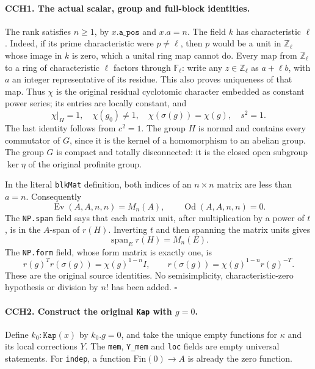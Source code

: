 \paragraph{CCH1. The actual scalar, group and full-block identities.}
\label{claim:CCH1}
The rank satisfies $n\ge1$, by $x.\texttt{a\_pos}$ and $x.a=n$.
The field $k$ has characteristic $\ell$.  Indeed, if its prime
characteristic were $p\ne\ell$, then $p$ would be a unit in
$\mathbb Z_\ell$ whose image in $k$ is zero, which a unital ring
map cannot do.  Every map from $\mathbb Z_\ell$ to a ring of
characteristic $\ell$ factors through $\mathbb F_\ell$: write any
$z\in\mathbb Z_\ell$ as $a+\ell b$, with $a$ an integer representative
of its residue.  This also proves uniqueness of that map.  Thus
$\chi$ is the original residual cyclotomic character embedded as
constant power series; its entries are locally constant, and
\[
 \chi|_H=1,\quad \chi(g_0)\ne1,\quad
 \chi(\sigma(g))=\chi(g),\quad s^2=1.
 \tag{CCH.3}
\]
The last identity follows from $c^2=1$.  The group $H$ is normal
and contains every commutator of $G$, since it is the kernel of a
homomorphism to an abelian group.  The group $G$ is compact and
totally disconnected: it is the closed open subgroup $\ker\eta$
of the original profinite group.

In the literal \texttt{blkMat} definition, both indices of an
$n\times n$ matrix are less than $a=n$.  Consequently
\[
 \operatorname{Ev}(A,A,n,n)=M_n(A),\qquad
 \operatorname{Od}(A,A,n,n)=0.                            \tag{CCH.4}
\]
The \texttt{NP.span} field says that each matrix unit, after
multiplication by a power of $t$, is in the $A$-span of $r(H)$.
Inverting $t$ and then spanning the matrix units gives
\[
                         \operatorname{span}_E r(H)=M_n(E).
 \tag{CCH.5}
\]
The \texttt{NP.form} field, whose form matrix is exactly one, is
\[
 r(g)^T r(\sigma(g))=\chi(g)^{1-n}I,
 \qquad
 r(\sigma(g))=\chi(g)^{1-n}r(g)^{-T}.                   \tag{CCH.6}
\]
These are the original source identities.  No semisimplicity,
characteristic-zero hypothesis or division by $n!$ has been added.
\hfill$\square$

\paragraph{CCH2. Construct the original \texttt{Kap} with $g=0$.}
\label{claim:CCH2}
Define $k_0:\texttt{Kap}(x)$ by $k_0.g=0$, and take the unique
empty functions for $\kappa$ and its local corrections $Y$.
The \texttt{mem}, \texttt{Y\_mem} and \texttt{loc} fields are
empty universal statements.  For \texttt{indep}, a function
$\mathrm{Fin}(0)\to A$ is already the zero function.


